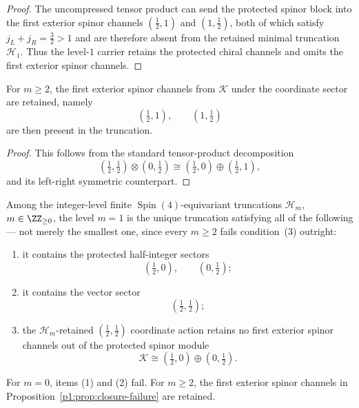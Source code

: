 \documentclass[11pt]{article}
\begin{document}
\begin{proof}
The uncompressed tensor product can send the protected spinor block into the
first exterior spinor channels \((\tfrac12,1)\) and \((1,\tfrac12)\), both of
which satisfy \(j_L+j_R=\tfrac32>1\) and are therefore absent from the retained
minimal truncation \(\mathcal H_1\).  Thus the level-\(1\) carrier retains the protected chiral channels and omits the first exterior spinor channels.
\end{proof}

\begin{proposition}
\label{p1:prop:closure-failure}
For \(m\ge 2\), the first exterior spinor channels from \(\mathcal K\) under the coordinate sector are retained, namely
\[
(\tfrac12,1),\qquad (1,\tfrac12)
\]
are then present in the truncation.
\end{proposition}

\begin{proof}
This follows from the standard tensor-product decomposition
\[
(\tfrac12,\tfrac12)\otimes(0,\tfrac12)\cong(\tfrac12,0)\oplus(\tfrac12,1),
\]
and its left-right symmetric counterpart.
\end{proof}

\begin{theorem}
\label{p1:thm:minimal-coordinate-closed-truncation}
\leavevmode\par
Among the integer-level finite \(\operatorname{Spin}(4)\)-equivariant truncations \(\mathcal H_m\), \(m\in\ZZ_{\ge0}\), the level \(m=1\) is the unique truncation satisfying all of the following --- not merely the smallest one, since every \(m\ge2\) fails condition~(3) outright:
\begin{enumerate}
    \item it contains the protected half-integer sectors
    \[
    \left(\tfrac12,0\right),\qquad \left(0,\tfrac12\right);
    \]
    \item it contains the vector sector
    \[
    \left(\tfrac12,\tfrac12\right);
    \]
    \item the \(\mathcal H_m\)-retained \((\tfrac12,\tfrac12)\) coordinate action retains no first exterior spinor channels out of the protected spinor module
    \[
    \mathcal K\cong \left(\tfrac12,0\right)\oplus\left(0,\tfrac12\right).
    \]
\end{enumerate}
For \(m=0\), items (1) and (2) fail. For \(m\ge 2\), the first exterior spinor channels in Proposition~\ref{p1:prop:closure-failure} are retained.
\end{theorem}
\end{document}
